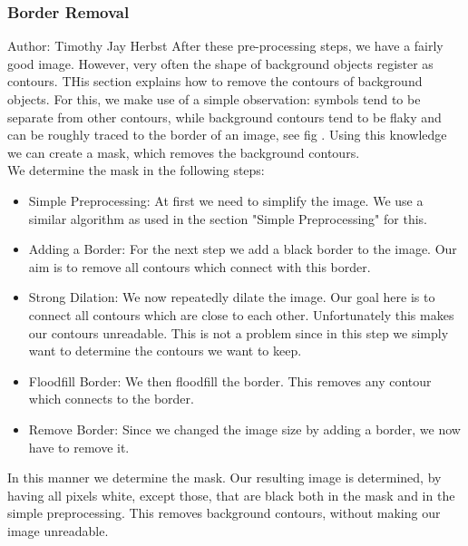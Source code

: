 \documentclass[12pt]{article}
\begin{document}
	
	\subsubsection{Border Removal}%
		\small{Author: Timothy Jay Herbst} \newline \newline
		After these pre-processing steps, we have a fairly good image.
		However, very often the shape of background objects register as contours.
		THis section explains how to remove the contours of background objects.
		For this, we make use of a simple observation: symbols tend to be separate from other contours, while background contours tend to be flaky and can be roughly traced to the border of an image, see fig .%
		Using this knowledge we can create a mask, which removes the background contours.\\
		We determine the mask in the following steps:
		\begin{itemize}
			\item Simple Preprocessing: At first we need to simplify the image. We use a similar algorithm as used in the section "Simple Preprocessing" for this.
			\item Adding a Border: For the next step we add a black border to the image. Our aim is to remove all contours which connect with this border.
			\item Strong Dilation: We now repeatedly dilate the image. Our goal here is to connect all contours which are close to each other.
			Unfortunately this makes our contours unreadable.
			This is not a problem since in this step we simply want to determine the contours we want to keep.
			\item Floodfill Border: We then floodfill the border.
			This removes any contour which connects to the border. 
			\item Remove Border: Since we changed the image size by adding a border, we now have to remove it.
		\end{itemize}
		In this manner we determine the mask.
		Our resulting image is determined, by having all pixels white, except those, that are black both in the mask and in the simple preprocessing.
		This removes background contours, without making our image unreadable.
\end{document}
